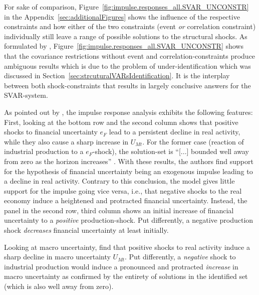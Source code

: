 \documentclass[a4paper,11pt,listof=nochaptergap,oneside,pointednumbers,bibtotoc,bigheadings,liststotoc,hidelinks]{scrbook}
\theoremstyle{mysatz}
\theoremstyle{mydefinition}
\theoremstyle{mytheorem}
\theoremstyle{mybemerkung}
\begin{document}
For sake of comparison, Figure~\ref{fig:impulse.responses_all.SVAR_UNCONSTR} in the Appendix~\ref{sec:additionalFigures} shows the influence of the respective constraints and how either of the two constraints (event \textit{or} correlation constraint) individually still leave a range of possible solutions to the structural shocks. As formulated by \citet{ludvigsonetal:19}, Figure~\ref{fig:impulse.responses_all.SVAR_UNCONSTR} shows that the covariance restrictions without event and correlation-constraints produce ambiguous results which is due to the problem of under-identification which was discussed in Section~\ref{sec:strcuturalVARsIdentification}. It is the interplay between both shock-constraints that results in largely conclusive answers for the SVAR-system. 

As pointed out by \citet{ludvigsonetal:18}, the impulse response analysis exhibits the following features: First, looking at the bottom row and the second column shows that positive shocks to financial uncertainty $e_F$ lead to a persistent decline in real activity, while they also cause a sharp increase in $U_{Mt}$. For the former case (reaction of industrial production to a $e_F$-shock), the solution-set is ``[...] bounded well away from zero as the horizon increases'' \citep[p. 19]{ludvigsonetal:18}. With these results, the authors find support for the hypothesis of financial uncertainty being an exogenous impulse leading to a decline in real activity. Contrary to this conclusion, the model gives little support for the impulse going vice versa, i.e., that negative shocks to the real economy induce a heightened and protracted financial uncertainty. Instead, the panel in the second row, third column shows an initial increase of financial uncertainty to a \textit{positive} production-shock. Put differently, a negative production shock \textit{decreases} financial uncertainty at least initially.




Looking at macro uncertainty, \citet{ludvigsonetal:18} find that positive shocks to real activity induce a sharp decline in macro uncertainty $U_{Mt}$. Put differently, a \textit{negative} shock to industrial production would induce a pronounced and protracted \textit{increase} in macro uncertainty as confirmed by the entirety of solutions in the identified set (which is also well away from zero). 
\end{document}

